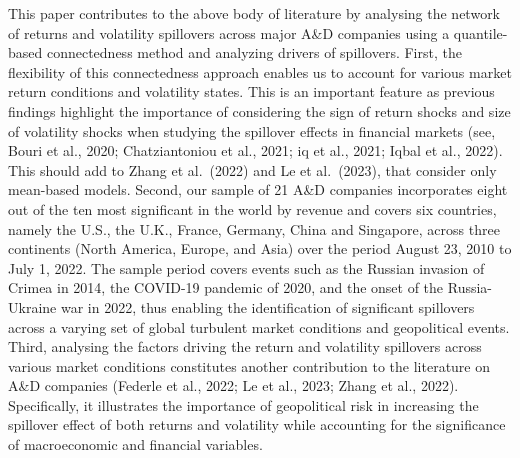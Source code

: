 \documentclass[
  letterpaper,
  DIV=11,
  numbers=noendperiod]{scrartcl}
\begin{document}
This paper contributes to the above body of literature by analysing the
network of returns and volatility spillovers across major A\&D companies
using a quantile-based connectedness method and analyzing drivers of
spillovers. First, the flexibility of this connectedness approach
enables us to account for various market return conditions and
volatility states. This is an important feature as previous findings
highlight the importance of considering the sign of return shocks and
size of volatility shocks when studying the spillover effects in
financial markets (see, Bouri et al., 2020; Chatziantoniou et al., 2021;
iq et al., 2021; Iqbal et al., 2022). This should add to Zhang et
al.~(2022) and Le et al.~(2023), that consider only mean-based models.
Second, our sample of 21 A\&D companies incorporates eight out of the
ten most significant in the world by revenue and covers six countries,
namely the U.S., the U.K., France, Germany, China and Singapore, across
three continents (North America, Europe, and Asia) over the period
August 23, 2010 to July 1, 2022. The sample period covers events such as
the Russian invasion of Crimea in 2014, the COVID-19 pandemic of 2020,
and the onset of the Russia-Ukraine war in 2022, thus enabling the
identification of significant spillovers across a varying set of global
turbulent market conditions and geopolitical events. Third, analysing
the factors driving the return and volatility spillovers across various
market conditions constitutes another contribution to the literature on
A\&D companies (Federle et al., 2022; Le et al., 2023; Zhang et al.,
2022). Specifically, it illustrates the importance of geopolitical risk
in increasing the spillover effect of both returns and volatility while
accounting for the significance of macroeconomic and financial
variables.
\end{document}
